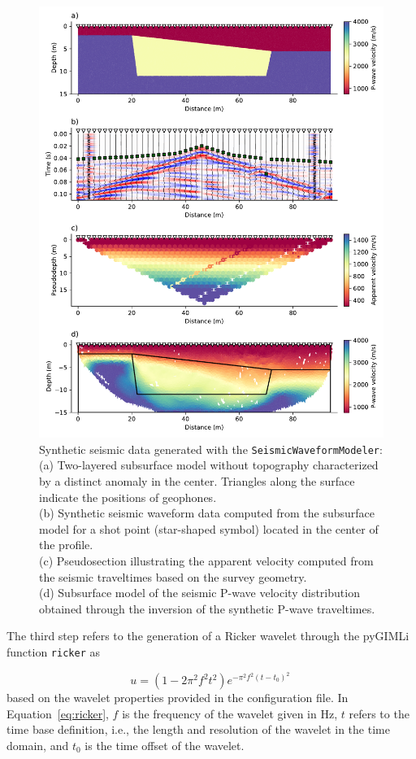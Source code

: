\documentclass[a4paper,fleqn]{cas-sc}
\begin{document}
\begin{figure}
	\centering
	\includegraphics[width=.75\textwidth]{figures/synthetic_data_example.pdf}
	\caption{Synthetic seismic data generated with the \texttt{SeismicWaveformModeler}: \\(a) Two-layered subsurface model without topography characterized by a distinct anomaly in the center. Triangles along the surface indicate the positions of geophones. \\(b) Synthetic seismic waveform data computed from the subsurface model for a shot point (star-shaped symbol) located in the center of the profile. \\(c) Pseudosection illustrating the apparent velocity computed from the seismic traveltimes based on the survey geometry. \\(d) Subsurface model of the seismic P-wave velocity distribution obtained through the inversion of the synthetic P-wave traveltimes.}
	\label{fig:syndataexample}
\end{figure}
The third step refers to the generation of a Ricker wavelet through the pyGIMLi function \texttt{ricker} as

\begin{equation}
	u = \left(1-2\pi^2f^2t^2\right)e^{-\pi^2f^2\left(t-t_0\right)^2}\,
	\label{eq:ricker}
\end{equation}
based on the wavelet properties provided in the configuration file. In Equation~\ref{eq:ricker}, $f$ is the frequency of the wavelet given in \unit{Hz}, $t$ refers to the time base definition, i.e., the length and resolution of the wavelet in the time domain, and $t_0$ is the time offset of the wavelet.
\end{document}
